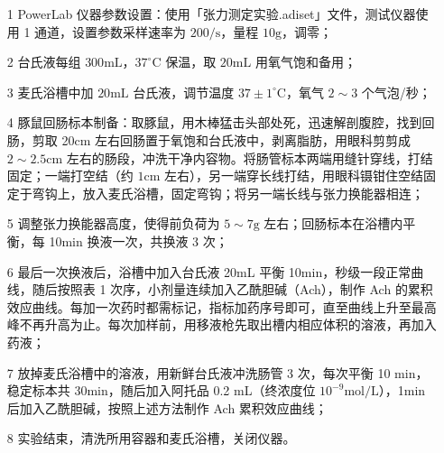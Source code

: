 \documentclass[UTF8]{ctexart}
\begin{document}
\begin{itemize}
    \item [1] PowerLab 仪器参数设置：使用「张力测定实验.adiset」文件，测试仪器使用 1 通道，设置参数采样速率为 $200/\text{s}$，量程 $10\text{g}$，调零；
    \item [2] 台氏液每组 $300\text{mL}$，$37^\circ\text{C}$ 保温，取 $20\text{mL}$ 用氧气饱和备用；
    \item [3] 麦氏浴槽中加 $20\text{mL}$ 台氏液，调节温度 $37\pm1^\circ\text{C}$，氧气 $2\sim 3$ 个气泡/秒；
    \item [4] 豚鼠回肠标本制备：取豚鼠，用木棒猛击头部处死，迅速解剖腹腔，找到回肠，剪取 20cm 左右回肠置于氧饱和台氏液中，剥离脂肪，用眼科剪剪成 $2\sim 2.5\text{cm}$ 左右的肠段，冲洗干净内容物。将肠管标本两端用缝针穿线，打结固定；一端打空结（约 $1\text{cm}$ 左右），另一端穿长线打结，用眼科镊钳住空结固定于弯钩上，放入麦氏浴槽，固定弯钩；将另一端长线与张力换能器相连；
    \item [5] 调整张力换能器高度，使得前负荷为 $5\sim 7\text{g}$ 左右；回肠标本在浴槽内平衡，每 10min 换液一次，共换液 3 次；
    \item [6] 最后一次换液后，浴槽中加入台氏液 20mL 平衡 10min，秒级一段正常曲线，随后按照表 1 次序，小剂量连续加入乙酰胆碱（Ach），制作 Ach 的累积效应曲线。每加一次药时都需标记，指标加药序号即可，直至曲线上升至最高峰不再升高为止。每次加样前，用移液枪先取出槽内相应体积的溶液，再加入药液；
    \item [7] 放掉麦氏浴槽中的溶液，用新鲜台氏液冲洗肠管 3 次，每次平衡 10 min，稳定标本共 30min，随后加入阿托品 0.2 mL（终浓度位 $10^{-9}\text{mol}/\text{L}$），1min 后加入乙酰胆碱，按照上述方法制作 Ach 累积效应曲线；
    \item [8] 实验结束，清洗所用容器和麦氏浴槽，关闭仪器。
\end{itemize}
\end{document}
